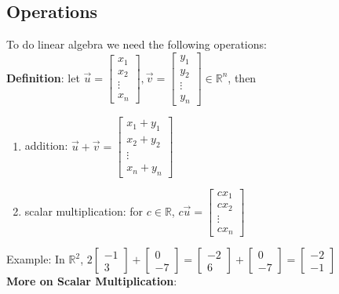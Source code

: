 \documentclass[12pt, letterpaper]{article}
\begin{document}
\subsection{Operations}
To do linear algebra we need the following operations: \\
\textbf{Definition}: let $\vec{u} = \begin{bmatrix} x_1 \\ x_2 \\ \vdots \\ x_n \end{bmatrix}, \vec{v} = \begin{bmatrix} y_1 \\ y_2 \\ \vdots \\ y_n \end{bmatrix} \in \mathbb{R}^n$, then 
\begin{enumerate}
    \item addition: $\vec{u} + \vec{v} = \begin{bmatrix} x_1 + y_1 \\ x_2 + y_2 \\ \vdots \\ x_n + y_n \end{bmatrix}$
    \item scalar multiplication: for $c\in\mathbb{R}$, $c\vec{u} = \begin{bmatrix} cx_1 \\ cx_2 \\ \vdots \\ cx_n \end{bmatrix}$
\end{enumerate}
Example: In $\mathbb{R}^2$, $2\begin{bmatrix} -1 \\ 3\end{bmatrix} + \begin{bmatrix} 0 \\ -7 \end{bmatrix} = \begin{bmatrix} -2 \\ 6 \end{bmatrix} + \begin{bmatrix} 0 \\ -7 \end{bmatrix} = \begin{bmatrix} -2 \\ -1\end{bmatrix}$ \\
\textbf{More on Scalar Multiplication}:
\end{document}
